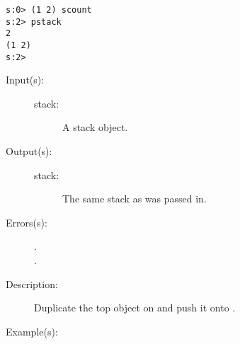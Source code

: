 \begin{description}
\begin{description}
\begin{verbatim}
s:0> (1 2) scount
s:2> pstack
2
(1 2)
s:2>
		\end{verbatim}
	\end{description}
\label{systemdict:sdup}
\item[{\stilop{stack}{sdup}{stack}}: ]
	\begin{description}\item[]
	\item[Input(s): ]
		\begin{description}\item[]
		\item[stack: ]
			A stack object.
		\end{description}
	\item[Output(s): ]
		\begin{description}\item[]
		\item[stack: ]
			The same stack as was passed in.
		\end{description}
	\item[Errors(s): ]
		\begin{description}\item[]
		\item[.]
		\item[.]
		\end{description}
	\item[Description: ]
		Duplicate the top object on  and push it onto
		.
	\item[Example(s): ]\begin{verbatim}


\end{verbatim}
\end{description}
\end{description}
